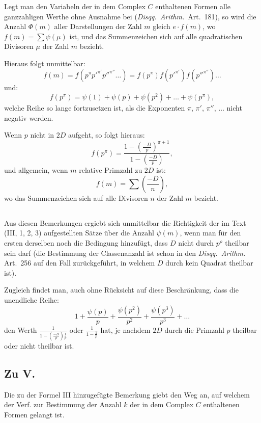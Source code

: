\documentclass[12pt,a4paper]{article}
\begin{document}
Legt man den Variabeln der in dem Complex $C$ enthaltenen Formen alle ganzzahligen Werthe ohne
Ausnahme bei (\textit{Disqq.~Arithm.}~Art.~181), so wird die Anzahl $\Phi(m)$ aller Darstellungen der Zahl $m$
gleich $e \cdot f(m)$, wo $f(m) = \sum \psi(\mu)$ ist, und das Summenzeichen sich auf alle quadratischen Divisoren
$\mu$ der Zahl $m$ bezieht.

Hieraus folgt unmittelbar:
\[
f(m) = f(p^{\pi} p'^{\pi'} p''^{\pi''} \ldots) = f(p^{\pi}) f(p'^{\pi'}) f(p''^{\pi''}) \ldots
\]
und:
\[
f(p^{\pi}) = \psi(1) + \psi(p) + \psi(p^2) + \ldots + \psi(p^{\pi}),
\]
welche Reihe so lange fortzusetzen ist, als die Exponenten $\pi$, $\pi'$, $\pi''$, $\ldots$ nicht negativ werden.

Wenn $p$ nicht in $2D$ aufgeht, so folgt hieraus:
\[
f(p^{\pi}) = \frac{1 - \left(\frac{-D}{p}\right)^{\pi+1}}{1 - \left(\frac{-D}{p}\right)},
\]
und allgemein, wenn $m$ relative Primzahl zu $2D$ ist:
\[
f(m) = \sum \left(\frac{-D}{n}\right),
\]
wo das Summenzeichen sich auf alle Divisoren $n$ der Zahl $m$ bezieht.


\subsection*{}

Aus diesen Bemerkungen ergiebt sich unmittelbar die Richtigkeit der im Text (III, 1, 2, 3) aufgestellten
Sätze über die Anzahl $\psi(m)$, wenn man für den ersten derselben noch die Bedingung hinzufügt,
dass $D$ nicht durch $p^{\rho}$ theilbar sein darf (die Bestimmung der Classenanzahl ist schon in den
\textit{Disqq.~Arithm.} Art.~256 auf den Fall zurückgeführt, in welchem $D$ durch kein Quadrat theilbar ist).

Zugleich findet man, auch ohne Rücksicht auf diese Beschränkung, dass die unendliche Reihe:
\[
1 + \frac{\psi(p)}{p} + \frac{\psi(p^2)}{p^2} + \frac{\psi(p^3)}{p^3} + \ldots
\]
den Werth $\frac{1}{1 - \left(\frac{-D}{p}\right)\frac{1}{p}}$ oder $\frac{1}{1 - \frac{1}{p}}$ hat, je nachdem $2D$ durch die Primzahl $p$
theilbar oder nicht theilbar ist.

\subsection*{Zu V.}

Die zu der Formel III hinzugefügte Bemerkung giebt den Weg an, auf welchem der Verf. zur Bestimmung
der Anzahl $k$ der in dem Complex $C$ enthaltenen Formen gelangt ist.
\end{document}
